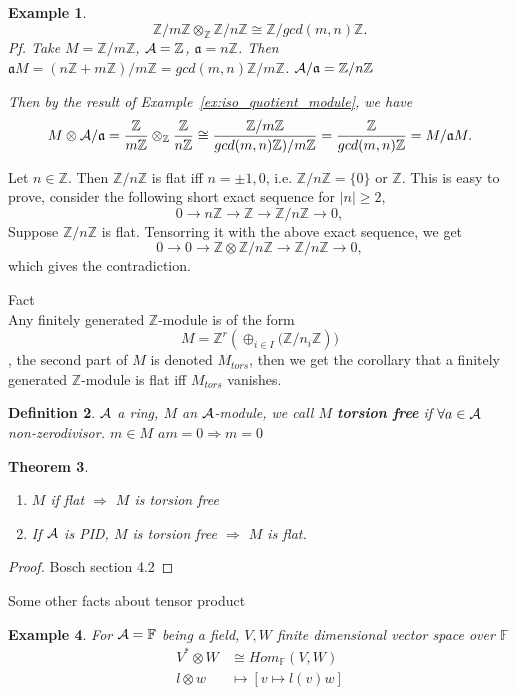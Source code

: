 \documentclass[11pt]{article}
\newtheorem{thm}{Theorem}[section]
\newtheorem{dfn}[thm]{Definition}
\newtheorem{ex}[thm]{Example}
\newcommand{\intg}{\mathbb Z}
\newcommand{\bbf}{\mathbb F}
\newcommand{\sca}{{\mathfrak a}}
\newcommand{\cala}{{\cal A}}
\newcommand{\Lrta}{\Longrightarrow}
\newcommand{\lrta}{\longrightarrow}
\begin{document}
\begin{ex}
$$\intg/m\intg\otimes_\intg \intg/n\intg\cong \intg/gcd(m,n)\intg.$$ 
Pf. Take $M=\intg/m\intg$, $\cala=\intg$, $\sca=n\intg$. Then $\sca M=(n\intg+m\intg)/m\intg=gcd(m,n)\intg/m\intg$. $\cala/\sca=\intg/n\intg$

Then by the result of Example~\ref{ex:iso_quotient_module}, we have
$$
M\otimes \cala/\sca=\frac{\intg}{m\intg}\otimes_\intg \frac{\intg}{n\intg}\cong\frac{\intg/m\intg}{gcd(m,n)\intg)/m\intg}= \frac{\intg}{gcd(m,n)\intg}=M/\sca M.
$$
\end{ex}

Let $n\in\intg$. Then $\intg/n\intg$ is flat iff $n=\pm1,0$, i.e. $\intg/n\intg=\{0\} \text{ or } \intg$. This is easy to prove, consider the following short exact sequence for $|n|\geq 2$,
$$
0\lrta n\intg\lrta \intg\lrta \intg/n\intg\lrta 0,
$$
Suppose $\intg/n\intg$ is flat. Tensorring it with the above exact sequence, we get
$$
0\lrta0\lrta \intg\otimes\intg/n\intg\lrta \intg/n\intg\lrta 0,
$$
which gives the contradiction. 

Fact\\
Any finitely generated $\intg$-module is of the form
$$
M=\intg^r\left(\oplus_{i\in I}(\intg/n_i\intg\right))
$$,
 the second part of $M$ is denoted $M_{tors}$, then we get the corollary that a finitely generated $\intg$-module is flat iff $M_{tors}$ vanishes.
\begin{dfn}
$\cala$ a ring, $M$ an $\cala$-module, we call $M$ \textbf{torsion free} if $\forall a\in \cala$ non-zerodivisor. $m\in M$ $am=0\Lrta m=0$
\end{dfn}

\begin{thm}\ 
\begin{enumerate}
\item $M$ if flat $\Lrta$ $M$ is torsion free
\item If $\cala$ is PID, $M$ is torsion free $\Lrta $ $M$ is flat.
\end{enumerate}
\end{thm}
\begin{proof}
Bosch section 4.2
\end{proof}

Some other facts about tensor product
\begin{ex}
For $\cala=\bbf$ being a field, $V, W$ finite dimensional vector space over $\bbf$
$$
\begin{aligned}
V^*\otimes W&\cong Hom_{\bbf}(V,W)\\
l\otimes w &\mapsto [v\mapsto l(v)w]
\end{aligned}
$$
\end{ex}
\end{document}
